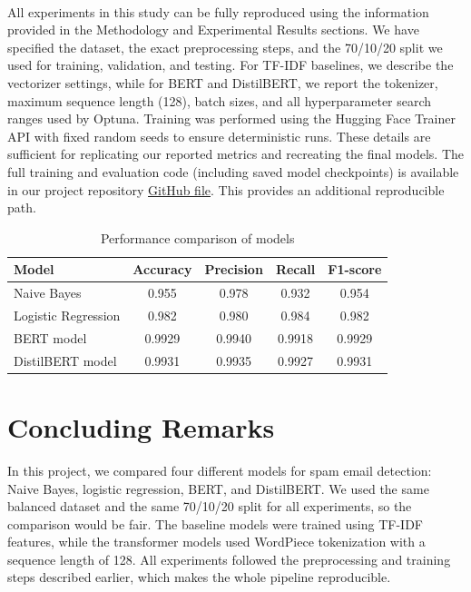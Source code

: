 \documentclass{article}
\begin{document}
\paragraph{}
All experiments in this study can be fully reproduced using the information provided in the Methodology and Experimental Results sections. We have specified the dataset, the exact preprocessing steps, and the 70/10/20 split we used for training, validation, and testing. For TF-IDF baselines, we describe the vectorizer settings, while for BERT and DistilBERT, we report the tokenizer, maximum sequence length (128), batch sizes, and all hyperparameter search ranges used by Optuna. Training was performed using the Hugging Face Trainer API with fixed random seeds to ensure deterministic runs. These details are sufficient for replicating our reported metrics and recreating the final models. The full training and evaluation code (including saved model checkpoints) is available in our project repository
\href{https://github.com/AydaNodel/COMP6321-Term-project--Spam-email-detection/tree/main}{GitHub file}. This provides an additional reproducible path.



\begin{table}[h!]
\centering
\caption{Performance comparison of models}
\begin{tabular}{lcccc}
\hline
\textbf{Model} & \textbf{Accuracy} & \textbf{Precision} & \textbf{Recall} & \textbf{F1-score} \\
\hline
Naive Bayes & 0.955 & 0.978 & 0.932 & 0.954 \\
Logistic Regression & 0.982 & 0.980 & 0.984 & 0.982 \\
BERT model & 0.9929 & 0.9940 & 0.9918 & 0.9929 \\
DistilBERT model & 0.9931   & 0.9935   & 0.9927    & 0.9931     \\
\hline
\end{tabular}
\label{tab:baseline_results}
\end{table}


\section{Concluding Remarks}

In this project, we compared four different models for spam email detection: Naive Bayes, logistic regression, BERT, and DistilBERT. We used the same balanced dataset and the same 70/10/20 split for all experiments, so the comparison would be fair. The baseline models were trained using TF-IDF features, while the transformer models used WordPiece tokenization with a sequence length of 128. All experiments followed the preprocessing and training steps described earlier, which makes the whole pipeline reproducible.
\end{document}
